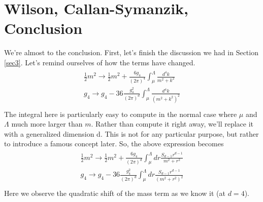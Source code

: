 \documentclass[12pt,halfline,a4paper]{ouparticle}
\begin{document}
\section{Wilson, Callan-Symanzik, Conclusion}
We're almost to the conclusion. First, let's finish the discussion we had in Section \ref{sec3}.
Let's remind ourselves of how the terms have changed. 
\begin{align}
\begin{split}
	\frac{1}{2}m^2\rightarrow\frac{1}{2} m^2+\frac{6g_4}{(2\pi)^4}\int^\Lambda_\mu\frac{d^4k}{m^2+k^2}\\
	g_4\rightarrow g_4-36\frac{g_4^2}{(2\pi)^d }\int^\Lambda_\mu\frac{d^4k}{(m^2+k^2)^2}\\
\end{split}	
\end{align}
The integral here is particularly easy to compute in the normal case where $\mu$ and $\Lambda$ much more larger than $m$. Rather than compute it right away, we'll replace it with a generalized dimension d. This is not for any particular purpose, but rather to introduce a famous concept later. So, the above expression becomes
\begin{align}
	\begin{split}
		\frac{1}{2}m^2\rightarrow\frac{1}{2} m^2+\frac{6g_4}{(2\pi)^d}\int^\Lambda_\mu dr\frac{S_{d-1}r^{d-1}}{m^2+r^2}\\
		g_4\rightarrow g_4-36\frac{g_4^2}{(2\pi)^d}\int^\Lambda_\mu dr\frac{S_{d-1}r^{d-1}}{(m^2+r^2)^2}\\
	\end{split}	
\end{align}
Here we observe the quadratic shift of the mass term as we know it (at $d=4$).
\end{document}
